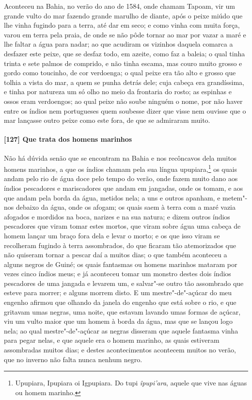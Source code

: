 Aconteceu na Bahia, no verão do ano de 1584, onde chamam Tapoam, vir um grande vulto do
mar fazendo grande marulho de diante, após o peixe miúdo que lhe vinha fugindo para a
terra, até dar em seco; e como vinha com muita força, varou em terra pela praia, de onde
se não pôde tornar ao mar por vazar a maré e lhe faltar a água para nadar; ao que acudiram
os vizinhos daquela comarca a desfazer este peixe, que se desfaz todo, em azeite, como faz
a baleia; o qual tinha trinta e sete palmos de comprido, e não tinha escama, mas couro
muito grosso e gordo como toucinho, de cor verdoenga; o qual peixe era tão alto e grosso
que tolhia a vista do mar, a quem se punha detrás dele; cuja cabeça era grandíssima, e
tinha por natureza um só olho no meio da frontaria do rosto; as espinhas e ossos eram
verdoengos; ao qual peixe não soube ninguém o nome, por não haver entre os índios nem
portugueses quem soubesse dizer que visse nem ouvisse que o mar lançasse outro peixe como
este fora, de que se admiraram muito.

\paragraph{[127] Que trata dos homens marinhos}\quad
Não há dúvida senão que se encontram na Bahia e nos recôncavos dela muitos homens
marinhos, a que os índios chamam pela sua língua upupiara,\footnote{ Upupiara, Ipupiara oi
Igpupiara. Do tupi \textit{îpupi'ara}, aquele que vive nas águas ou homem marinho.} os
quais andam pelo rio de água doce pelo tempo do verão, onde fazem muito dano aos índios
pescadores e mariscadores que andam em jangadas, onde os tomam, e aos que andam pela borda
da água, metidos nela; a uns e outros apanham, e metem"-nos debaixo da água, onde os
afogam; os quais saem à terra com a maré vazia afogados e mordidos na boca, narizes e na
sua natura; e dizem outros índios pescadores que viram tomar estes mortos, que viram sobre
água uma cabeça de homem lançar um braço fora dela e levar o morto; e os que isso viram se
recolheram fugindo à terra assombrados, do que ficaram tão atemorizados que não quiseram
tornar a pescar daí a muitos dias; o que também aconteceu a alguns negros de Guiné; os
quais fantasmas ou homens marinhos mataram por vezes cinco índios meus; e já aconteceu
tomar um monstro destes dois índios pescadores de uma jangada e levarem um, e salvar"-se
outro tão assombrado que esteve para morrer; e alguns morrem disto. E um mestre"-de"-açúcar
do meu engenho afirmou que olhando da janela do engenho que está sobre o rio, e que
gritavam umas negras, uma noite, que estavam lavando umas formas de açúcar, viu um vulto
maior que um homem à borda da água, mas que se lançou logo nela; ao qual mestre"-de"-açúcar
as negras disseram que aquele fantasma vinha para pegar nelas, e que aquele era o homem
marinho, as quais estiveram assombradas muitos dias; e destes acontecimentos acontecem
muitos no verão, que no inverno não falta nunca nenhum negro.


